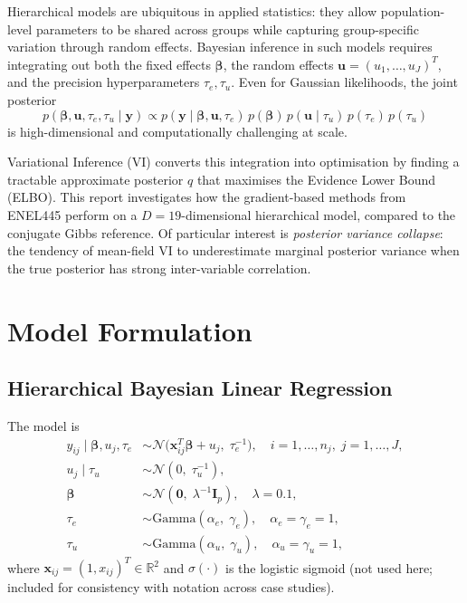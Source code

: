 \documentclass[11pt,a4paper]{article}
\newcommand{\R}{\mathbb{R}}
\newcommand{\N}{\mathcal{N}}
\begin{document}
Hierarchical models are ubiquitous in applied statistics: they allow population-level
parameters to be shared across groups while capturing group-specific variation through
random effects.
Bayesian inference in such models requires integrating out both the fixed effects
$\bm{\beta}$, the random effects $\mathbf{u}=(u_1,\ldots,u_J)^T$, and the precision
hyperparameters $\tau_e, \tau_u$.
Even for Gaussian likelihoods, the joint posterior
\begin{equation*}
  p(\bm{\beta},\mathbf{u},\tau_e,\tau_u \mid \mathbf{y})
  \propto p(\mathbf{y}\mid\bm{\beta},\mathbf{u},\tau_e)\,
           p(\bm{\beta})\,p(\mathbf{u}\mid\tau_u)\,
           p(\tau_e)\,p(\tau_u)
\end{equation*}
is high-dimensional and computationally challenging at scale.

Variational Inference (VI) converts this integration into optimisation by finding
a tractable approximate posterior $q$ that maximises the Evidence Lower Bound (ELBO).
This report investigates how the gradient-based methods from ENEL445 perform on a
$D=19$-dimensional hierarchical model, compared to the conjugate Gibbs reference.
Of particular interest is \emph{posterior variance collapse}: the tendency of
mean-field VI to underestimate marginal posterior variance when the true posterior
has strong inter-variable correlation.

\section{Model Formulation}

\subsection{Hierarchical Bayesian Linear Regression}

The model is
\begin{align}
  y_{ij} \mid \bm{\beta}, u_j, \tau_e
    &\sim \mathcal{N}\!\bigl(\mathbf{x}_{ij}^T\bm{\beta} + u_j,\; \tau_e^{-1}\bigr),
    \quad i=1,\ldots,n_j,\; j=1,\ldots,J,\\
  u_j \mid \tau_u &\sim \mathcal{N}(0,\; \tau_u^{-1}),\\
  \bm{\beta} &\sim \N(\bm{0},\; \lambda^{-1}\bm{I}_p), \quad \lambda=0.1,\\
  \tau_e &\sim \mathrm{Gamma}(\alpha_e,\; \gamma_e), \quad \alpha_e=\gamma_e=1,\\
  \tau_u &\sim \mathrm{Gamma}(\alpha_u,\; \gamma_u), \quad \alpha_u=\gamma_u=1,
\end{align}
where $\mathbf{x}_{ij} = (1, x_{ij})^T \in \R^2$ and $\sigma(\cdot)$ is the logistic sigmoid
(not used here; included for consistency with notation across case studies).
\end{document}
